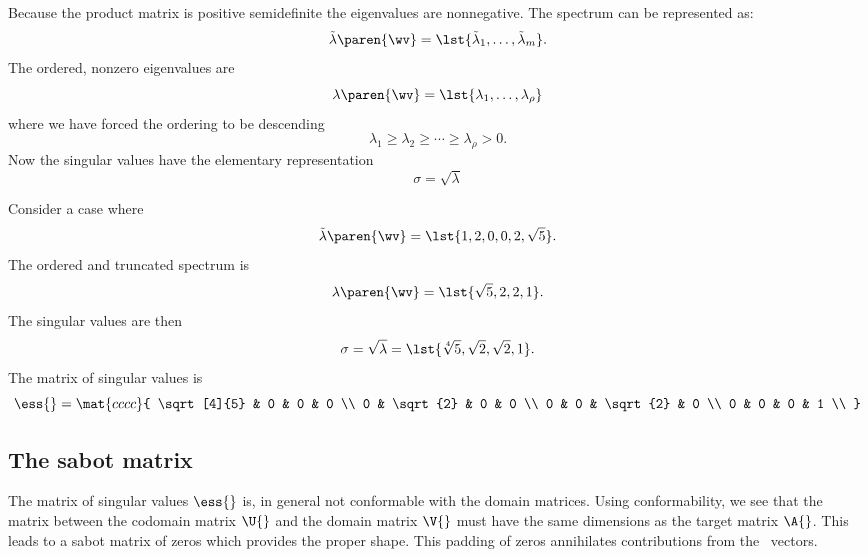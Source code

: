 Because the product matrix is positive semidefinite the eigenvalues are nonnegative.
The spectrum can be represented as:
\begin{equation}
  \tilde{\lambda} \paren{\wv} = \lst{\tilde{\lambda}_{1},\dots, \tilde{\lambda}_{m}}.
\end{equation}
The ordered, nonzero eigenvalues are
\begin{equation}
  \lambda \paren{\wv} = \lst{ \lambda_{1},\dots, \lambda_{\rho}}
\end{equation}
where we have forced the ordering to be descending
\begin{equation}
  \lambda_{1} \ge \lambda_{2} \ge \cdots \ge \lambda_{\rho} > 0.
\end{equation}
Now the singular values have the elementary representation
\begin{equation}
  \sigma = \sqrt{\lambda}
\end{equation}

Consider a case where
\begin{equation*}
  \tilde{\lambda} \paren{\wv} = \lst{1, 2, 0, 0, 2, \sqrt{5}}.
\end{equation*}
The ordered and truncated spectrum is
\begin{equation}
  \lambda\paren{ \wv }  =  \lst{ \sqrt{5}, 2, 2, 1}.
\end{equation}
The singular values are then
\begin{equation}
  \sigma = \sqrt{ \lambda } = \lst{ \sqrt[4]{5}, \sqrt{2}, \sqrt{2}, 1 }.
\end{equation}
The matrix of singular values is
\begin{equation}
  \ess{} = \mat{cccc}{ 
  \sqrt[4]{5} & 0 & 0 & 0 \\
   0 & \sqrt{2} & 0 & 0 \\
   0 & 0 & \sqrt{2} & 0 \\
   0 & 0 & 0 & 1 \\
  }
\end{equation}

\subsection{The sabot matrix}
The matrix of singular values $\ess{}$ is, in general not conformable with the domain matrices. Using conformability, we see that the matrix between the codomain matrix $\U{}$ and the domain matrix $\V{}$ must have the same dimensions as the target matrix $\A{}$. This leads to a sabot matrix of zeros which provides the proper shape. This padding of zeros annihilates contributions from the \ns \ vectors. 

